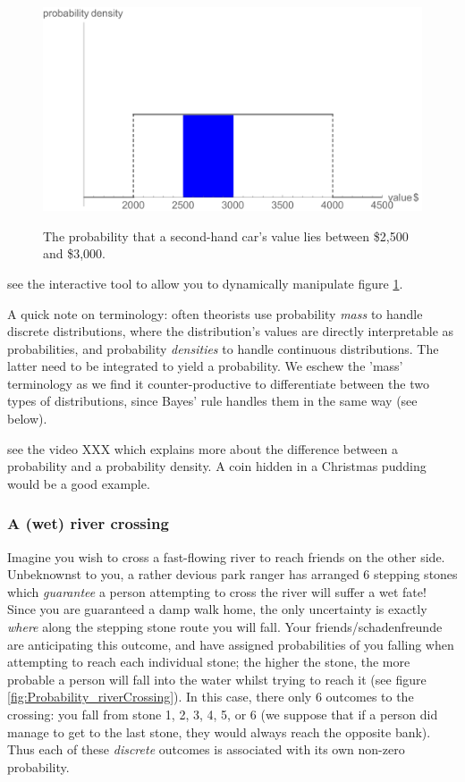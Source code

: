 \documentclass[11pt,fullpage]{book}
\begin{document}
\begin{figure}
\centering
\scalebox{0.5} 
{\includegraphics{Probability_continuousLotteryInterval.pdf}}
\caption{The probability that a second-hand car's value lies between \$2,500 and \$3,000.}\label{fig:Probability_continuousLotteryInterval}
\end{figure}

 see the interactive tool to allow you to dynamically manipulate figure \ref{fig:Probability_continuousLotteryInterval}.

A quick note on terminology: often theorists use probability \textit{mass} to handle discrete distributions, where the distribution's values are directly interpretable as probabilities, and probability \textit{densities} to handle continuous distributions. The latter need to be integrated to yield a probability. We eschew the 'mass' terminology as we find it counter-productive to differentiate between the two types of distributions, since Bayes' rule handles them in the same way (see below).

 see the video XXX which explains more about the difference between a probability and a probability density. A coin hidden in a Christmas pudding would be a good example.

\subsubsection{A (wet) river crossing}
Imagine you wish to cross a fast-flowing river to reach friends on the other side. Unbeknownst to you, a rather devious park ranger has arranged 6 stepping stones which \textit{guarantee} a person attempting to cross the river will suffer a wet fate! Since you are guaranteed a damp walk home, the only uncertainty is exactly \textit{where} along the stepping stone route you will fall. Your friends/schadenfreunde are anticipating this outcome, and have assigned probabilities of you falling when attempting to reach each individual stone; the higher the stone, the more probable a person will fall into the water whilst trying to reach it (see figure \ref{fig:Probability_riverCrossing}). In this case, there only 6 outcomes to the crossing: you fall from stone 1, 2, 3, 4, 5, or 6 (we suppose that if a person did manage to get to the last stone, they would always reach the opposite bank). Thus each of these \textit{discrete} outcomes is associated with its own non-zero probability. 
\end{document}
